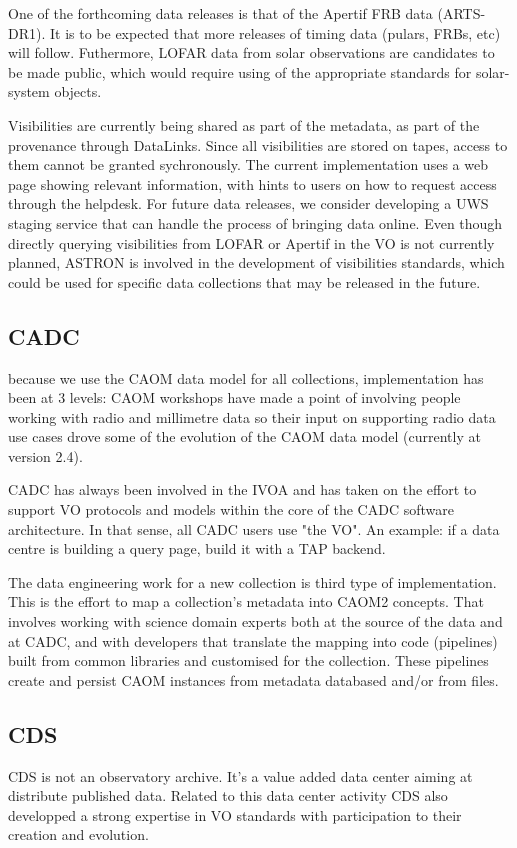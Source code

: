 \documentclass[11pt,a4paper]{ivoatex/ivoa}
\begin{document}
{One of the forthcoming data releases is that of the Apertif FRB data (ARTS-DR1). It is to be expected that more releases of timing data (pulars, FRBs, etc) will follow. Futhermore, LOFAR data from solar observations are candidates to be made public, which would require using of the appropriate standards for solar-system objects. 

Visibilities are currently being shared as part of the metadata, as part of the provenance through DataLinks. Since all visibilities are stored on tapes, access to them cannot be granted sychronously. The current implementation uses a web page showing relevant information, with hints to users on how to request access through the helpdesk. For future data releases, we consider developing a UWS staging service that can handle the process of bringing data online. Even though directly querying visibilities from LOFAR or Apertif in the VO is not currently planned, ASTRON is involved in the development of visibilities standards, which could be used for specific data collections that may be released in the future. 

\subsection{CADC}
\label{sec:CADC}
because we use the CAOM data model for all collections, implementation has been at 3 levels:
CAOM workshops have made a point of involving people working with radio and millimetre data so their 
input on supporting radio data use cases drove some of the evolution of the CAOM data model (currently 
at version 2.4).

CADC has always been involved in the IVOA and has taken on the effort to support VO protocols and models 
within the core of the CADC software architecture. In that sense, all CADC users use "the VO".  An 
example: if a data centre is building a query page, build it with a TAP backend.

The data engineering work for a new collection is third type of implementation. This is the effort to 
map a collection's metadata into CAOM2 concepts. That involves working with science domain experts both 
at the source of the data and at CADC, and with developers that translate the mapping into code 
(pipelines) built from common libraries and customised for the collection. These pipelines create and 
persist CAOM instances from metadata databased and/or from files.

\subsection{CDS}
\label{sec:CDS}
CDS is not an observatory archive. It's a value added data center aiming at distribute published data. Related to this data center activity CDS also developped a strong expertise in VO standards with participation to their creation and evolution.  

}
\end{document}
